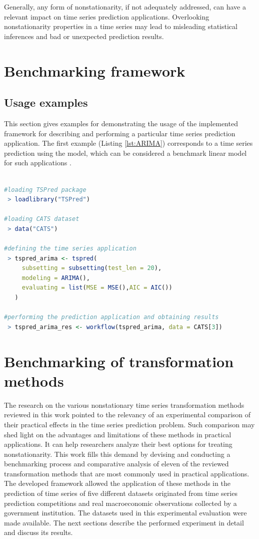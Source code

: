 \documentclass[11pt]{dippg}
\begin{document}
Generally, any form of nonstationarity, if not adequately addressed, can have a relevant impact on time series prediction applications. Overlooking nonstationarity properties in a time series may lead to misleading statistical inferences and bad or unexpected prediction results.

\chapter{Benchmarking framework}\label{framework}
\section{Usage examples} \label{usage}
This section gives examples for demonstrating the usage of the implemented framework for describing and performing a particular time series prediction application. The first example (Listing \ref{lst:ARIMA}) corresponds to a time series prediction using the  model, which can be considered a benchmark linear model for such applications \cite{salles_framework_2017}.

\begin{lstlisting}[language=R, caption={[ARIMA model prediction application]R example for an ARIMA model prediction application using \textit{TSPred}}, label={lst:ARIMA}]

#loading TSPred package
 > loadlibrary("TSPred")

#loading CATS dataset
 > data("CATS")

#defining the time series application
 > tspred_arima <- tspred(
     subsetting = subsetting(test_len = 20),
     modeling = ARIMA(),
     evaluating = list(MSE = MSE(),AIC = AIC())
   )

#performing the prediction application and obtaining results
 > tspred_arima_res <- workflow(tspred_arima, data = CATS[3])
\end{lstlisting}

\chapter{Benchmarking of transformation methods}\label{experiment}

The research on the various nonstationary time series transformation methods reviewed in this work pointed to the relevancy of an experimental comparison of their practical effects in the time series prediction problem. Such comparison may shed light on the advantages and limitations of these methods in practical applications. It can help researchers analyze their best options for treating nonstationarity. This work fills this demand by devising and conducting a benchmarking process and comparative analysis of eleven of the reviewed transformation methods that are most commonly used in practical applications. The developed framework allowed the application of these methods in the prediction of time series of five different datasets originated from time series prediction competitions and real macroeconomic observations collected by a government institution. The datasets used in this experimental evaluation were made available. The next sections describe the performed experiment in detail and discuss its results.
\end{document}
